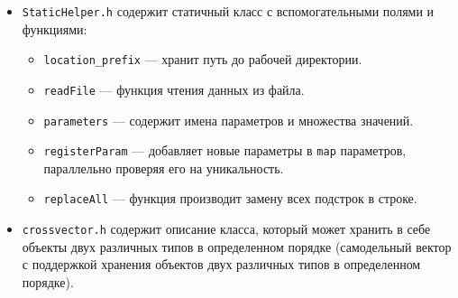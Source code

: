 \documentclass[a4paper, 12pt]{article}
\newcommand{\cd}[1]{\lstinline$#1$}
\begin{document}
\begin{itemize}
\begin{itemize}
			\item \cd{StaticHelper.h} содержит статичный класс с вспомогательными полями и функциями: 
				\begin{itemize}
					\item \cd{location_prefix} --- хранит путь до рабочей директории.
					\item \cd{readFile} --- функция чтения данных из файла.
					\item \cd{parameters} --- содержит имена параметров и множества значений.
					\item \cd{registerParam} --- добавляет новые параметры в \cd{map} параметров, параллельно проверяя его на уникальность.
					\item \cd{replaceAll} --- функция производит замену всех подстрок в строке.
				\end{itemize}
			\item \cd{crossvector.h} содержит описание класса, который может хранить в себе объекты двух различных типов в определенном порядке (самодельный вектор с поддержкой хранения объектов двух различных типов в определенном порядке). 
		\end{itemize}
	\end{itemize}
	
\end{document}
